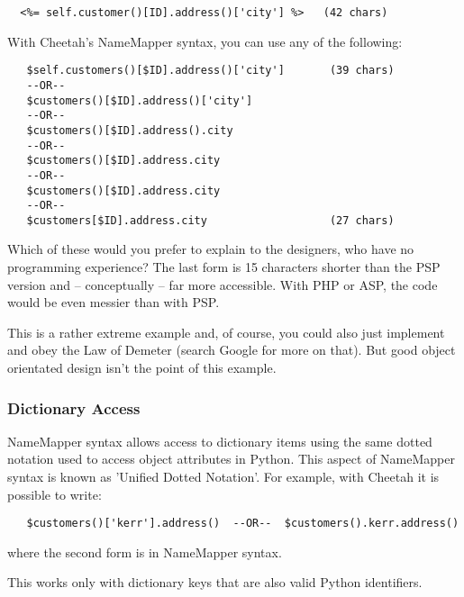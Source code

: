 \begin{verbatim}
  <%= self.customer()[ID].address()['city'] %>   (42 chars)
\end{verbatim}

With Cheetah's NameMapper syntax, you can use any of the following:

\begin{verbatim}
   $self.customers()[$ID].address()['city']       (39 chars)
   --OR--                                         
   $customers()[$ID].address()['city']           
   --OR--                                         
   $customers()[$ID].address().city              
   --OR--                                         
   $customers()[$ID].address.city                
   --OR--                                         
   $customers()[$ID].address.city
   --OR--
   $customers[$ID].address.city                   (27 chars)                     
\end{verbatim}   

Which of these would you prefer to explain to the designers, who have no
programming experience?  The last form is 15 characters shorter than the PSP
version and -- conceptually -- far more accessible. With PHP or ASP, the
code would be even messier than with PSP.

This is a rather extreme example and, of course, you could also just implement
 and obey the Law of Demeter (search Google for more
on that).  But good object orientated design isn't the point of this example.

\subsubsection{Dictionary Access}
\label{language.namemapper.dict}

NameMapper syntax allows access to dictionary items using the same dotted
notation used to access object attributes in Python.  This aspect of NameMapper
syntax is known as 'Unified Dotted Notation'.
For example, with Cheetah it is possible to write:
\begin{verbatim}
   $customers()['kerr'].address()  --OR--  $customers().kerr.address()
\end{verbatim}
where the second form is in NameMapper syntax.

This works only with dictionary keys that are also valid Python identifiers.

